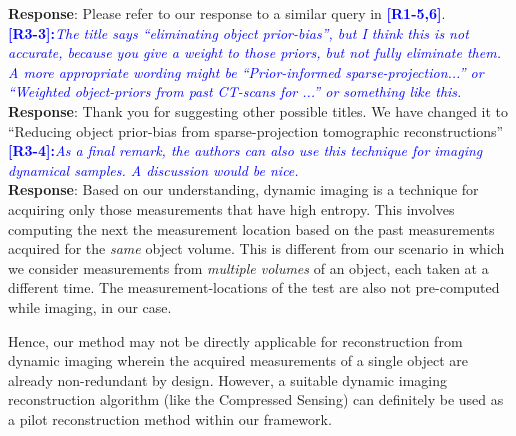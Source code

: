 \documentclass{article}
\begin{document}
\textbf{Response}: Please refer to our response to a similar query in \textcolor{blue}{\textbf{[R1-5,6]}}.\\


\textcolor{blue}{\textbf{[R3-3]:}\textit{The title says ``eliminating object prior-bias'', but I think this is not accurate, because you give a weight to those priors, but not fully eliminate them. A more appropriate wording might be ``Prior-informed sparse-projection...'' or ``Weighted object-priors from past CT-scans for ...'' or something like this.}}\\

\textbf{Response}: Thank you for suggesting other possible titles. We have changed it to ``Reducing object prior-bias from sparse-projection tomographic reconstructions''\\


\textcolor{blue}{\textbf{[R3-4]:}\textit{As a final remark, the authors can also use this technique for imaging dynamical samples. A discussion would be nice.}}\\

\textbf{Response}: Based on our understanding, dynamic imaging is a technique for acquiring only those measurements that have high entropy. This involves computing the next the measurement location based on the past measurements acquired for the \textit{same} object volume. This is different from our scenario in which we consider measurements from \textit{multiple volumes} of an object, each taken at a different time. The measurement-locations of the test are also not pre-computed while imaging, in our case. 

Hence, our method may not be directly applicable for reconstruction from dynamic imaging wherein the acquired measurements of a single object are already non-redundant by design. However, a suitable dynamic imaging reconstruction algorithm (like the Compressed Sensing)  can definitely be used as a pilot reconstruction method within our framework. 



    
  
\end{document}
